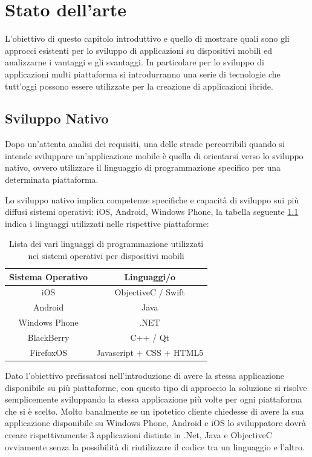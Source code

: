 \chapter{Stato dell'arte} 
L'obiettivo di questo capitolo introduttivo e quello di mostrare quali sono gli approcci esistenti per lo sviluppo di applicazioni su dispositivi mobili ed analizzarne i vantaggi e gli svantaggi.
In particolare per lo sviluppo di applicazioni multi piattaforma si introdurranno una serie di tecnologie che tutt'oggi possono essere utilizzate per la creazione di applicazioni ibride.

\section{Sviluppo Nativo}
Dopo un'attenta analisi dei requisiti, una delle strade percorribili quando si intende sviluppare un'applicazione mobile è quella di orientarsi verso lo sviluppo nativo, ovvero utilizzare il linguaggio di programmazione specifico per una determinata piattaforma.

Lo sviluppo nativo implica competenze specifiche e capacità di sviluppo sui più diffusi sistemi operativi: iOS, Android, Windows Phone, la tabella seguente \ref{tbl: TabellaOS} indica i linguaggi utilizzati nelle rispettive piattaforme:

\begin{table}[h]
	\centering
    	\begin{tabular}{cc}
      	\hline
        	\textbf{Sistema Operativo} & \textbf{Linguaggi/o}     \\ \hline
        	iOS                        & ObjectiveC / Swift       \\ \hline
        	Android                    & Java                     \\ \hline
        	Windows Phone              & .NET                     \\ \hline
        	BlackBerry                 & C++ / Qt                 \\ \hline
        	FirefoxOS                  & Javascript + CSS + HTML5 \\ \hline
    	\end{tabular}
    	\caption{Lista dei vari linguaggi di programmazione utilizzati nei sistemi operativi per dispositivi 		
    			 mobili}
		\label{tbl: TabellaOS}
\end{table}

Dato l'obiettivo prefissatosi nell'introduzione di avere la stessa applicazione disponibile su più piattaforme, con questo tipo di approccio la soluzione si risolve semplicemente sviluppando la stessa applicazione più volte per ogni piattaforma che si è scelto. 
Molto banalmente se un ipotetico cliente chiedesse di avere la sua applicazione disponibile su Windows Phone, Android e iOS lo sviluppatore dovrà creare rispettivamente 3 applicazioni distinte in .Net, Java e ObjectiveC ovviamente senza la possibilità di riutilizzare il codice tra un linguaggio e l'altro.

